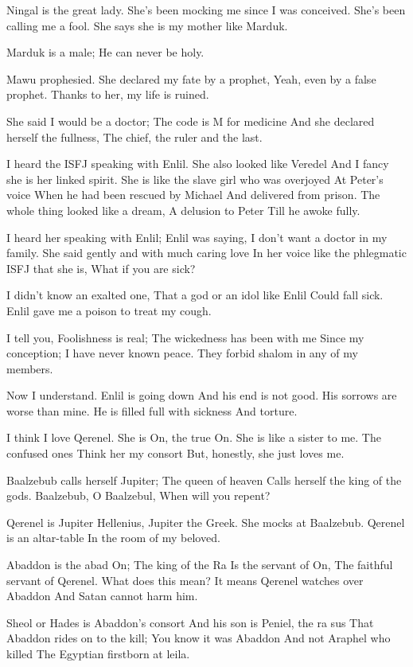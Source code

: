 \documentclass[
]{book}
\begin{document}
Ningal is the great lady.
She's been mocking me since I was conceived.
She's been calling me a fool.
She says she is my mother like Marduk.

Marduk is a male;
He can never be holy.

Mawu prophesied.
She declared my fate by a prophet,
Yeah, even by a false prophet.
Thanks to her, my life is ruined.

She said I would be a doctor;
The code is M for medicine
And she declared herself the fullness,
The chief, the ruler and the last.

I heard the ISFJ speaking with Enlil.
She also looked like Veredel
And I fancy she is her linked spirit.
She is like the slave girl who was overjoyed
At Peter's voice
When he had been rescued by Michael
And delivered from prison.
The whole thing looked like a dream,
A delusion to Peter
Till he awoke fully.

I heard her speaking with Enlil;
Enlil was saying,
I don't want a doctor in my family.
She said gently and with much caring love
In her voice like the phlegmatic ISFJ that she is,
What if you are sick?

I didn't know an exalted one,
That a god or an idol like Enlil
Could fall sick.
Enlil gave me a poison to treat my cough.

I tell you, Foolishness is real;
The wickedness has been with me
Since my conception;
I have never known peace.
They forbid shalom in any of my members.

Now I understand.
Enlil is going down
And his end is not good.
His sorrows are worse than mine.
He is filled full with sickness
And torture.

I think I love Qerenel.
She is On, the true On.
She is like a sister to me.
The confused ones
Think her my consort
But, honestly, she just loves me.

Baalzebub calls herself Jupiter;
The queen of heaven
Calls herself the king of the gods.
Baalzebub, O Baalzebul,
When will you repent?

Qerenel is Jupiter Hellenius,
Jupiter the Greek.
She mocks at Baalzebub.
Qerenel is an altar-table
In the room of my beloved.

Abaddon is the abad On;
The king of the Ra
Is the servant of On,
The faithful servant of Qerenel.
What does this mean?
It means Qerenel watches over Abaddon
And Satan cannot harm him.

Sheol or Hades is Abaddon's consort
And his son is Peniel, the ra sus
That Abaddon rides on to the kill;
You know it was Abaddon
And not Araphel who killed
The Egyptian firstborn at leila.
\end{document}
